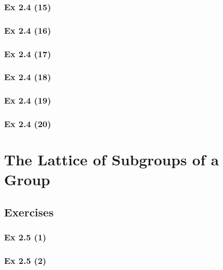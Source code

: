 \subsubsection{Ex 2.4 (15)}\label{sec:Ex_2.4.15}

\subsubsection{Ex 2.4 (16)}\label{sec:Ex_2.4.16}

\subsubsection{Ex 2.4 (17)}\label{sec:Ex_2.4.17}

\subsubsection{Ex 2.4 (18)}\label{sec:Ex_2.4.18}

\subsubsection{Ex 2.4 (19)}\label{sec:Ex_2.4.19}

\subsubsection{Ex 2.4 (20)}\label{sec:Ex_2.4.20}

\newpage		%

\section{The Lattice of Subgroups of a Group}\label{sec:2.5}
\subsection*{Exercises}\label{sec:2.5_Exercises}

\subsubsection{Ex 2.5 (1)}\label{sec:Ex_2.5.1}

\subsubsection{Ex 2.5 (2)}\label{sec:Ex_2.5.2}

